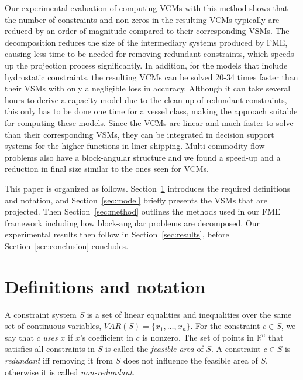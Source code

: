 \documentclass{llncs}
\newcommand{\VAR}{\mathit{VAR}}
\begin{document}
Our experimental evaluation of computing VCMs with this method shows that the number of constraints and non-zeros in the resulting VCMs typically are reduced by an order of magnitude compared to their corresponding VSMs. The decomposition reduces the size of the intermediary systems produced by FME, causing less time to be needed for removing redundant constraints, which speeds up the projection process significantly. In addition, for the models that include hydrostatic constraints, the resulting VCMs can be solved 20-34 times faster than their VSMs with only a negligible loss in accuracy. Although it can take several hours to derive a capacity model due to the clean-up of redundant constraints, this only has to be done one time for a vessel class, making the approach suitable for computing these models. Since the VCMs are linear and much faster to solve than their corresponding VSMs, they can be integrated in decision support systems for the higher functions in liner shipping. Multi-commodity flow problems also have a block-angular structure and we found a speed-up and a reduction in final size similar to the ones seen for VCMs.

This paper is organized as follows. Section~\ref{sec:notation} introduces the required definitions and notation,  
and Section~\ref{sec:model} briefly presents the VSMs that are projected. Then Section~\ref{sec:method} outlines the methods used in our FME framework including how block-angular problems are decomposed. Our experimental results then follow in Section~\ref{sec:results}, before Section~\ref{sec:conclusion} concludes.
\section{Definitions and notation} \label{sec:notation}
A constraint system $S$ is a set of linear equalities and inequalities over the same set of continuous variables, $\VAR(S)=\{x_1,\ldots, x_n\}$.  
For the constraint $c\in S$, we say that $c$ \emph{uses} $x$ if $x$'s coefficient in $c$ is nonzero. 
The set of points in $\mathbb{R}^n$ that satisfies all constraints in $S$ is called the \emph{feasible area} of $S$. A constraint $c\in S$ is \emph{redundant} iff removing it from $S$ does not influence the feasible area of $S$, otherwise it is called \emph{non-redundant}.  
\end{document}
